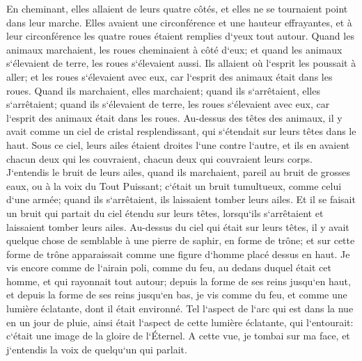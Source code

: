 \verse En cheminant, elles allaient de leurs quatre côtés, et elles ne se tournaient point dans leur marche. 
\verse Elles avaient une circonférence et une hauteur effrayantes, et à leur circonférence les quatre roues étaient remplies d`yeux tout autour. 
\verse Quand les animaux marchaient, les roues cheminaient à côté d`eux; et quand les animaux s`élevaient de terre, les roues s`élevaient aussi. 
\verse Ils allaient où l`esprit les poussait à aller; et les roues s`élevaient avec eux, car l`esprit des animaux était dans les roues. 
\verse Quand ils marchaient, elles marchaient; quand ils s`arrêtaient, elles s`arrêtaient; quand ils s`élevaient de terre, les roues s`élevaient avec eux, car l`esprit des animaux était dans les roues. 
\verse Au-dessus des têtes des animaux, il y avait comme un ciel de cristal resplendissant, qui s`étendait sur leurs têtes dans le haut. 
\verse Sous ce ciel, leurs ailes étaient droites l`une contre l`autre, et ils en avaient chacun deux qui les couvraient, chacun deux qui couvraient leurs corps. 
\verse J`entendis le bruit de leurs ailes, quand ils marchaient, pareil au bruit de grosses eaux, ou à la voix du Tout Puissant; c`était un bruit tumultueux, comme celui d`une armée; quand ils s`arrêtaient, ils laissaient tomber leurs ailes. 
\verse Et il se faisait un bruit qui partait du ciel étendu sur leurs têtes, lorsqu`ils s`arrêtaient et laissaient tomber leurs ailes. 
\verse Au-dessus du ciel qui était sur leurs têtes, il y avait quelque chose de semblable à une pierre de saphir, en forme de trône; et sur cette forme de trône apparaissait comme une figure d`homme placé dessus en haut. 
\verse Je vis encore comme de l`airain poli, comme du feu, au dedans duquel était cet homme, et qui rayonnait tout autour; depuis la forme de ses reins jusqu`en haut, et depuis la forme de ses reins jusqu`en bas, je vis comme du feu, et comme une lumière éclatante, dont il était environné. 
\verse Tel l`aspect de l`arc qui est dans la nue en un jour de pluie, ainsi était l`aspect de cette lumière éclatante, qui l`entourait: c`était une image de la gloire de l`Éternel. A cette vue, je tombai sur ma face, et j`entendis la voix de quelqu`un qui parlait. 

